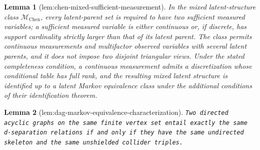 \documentclass{article}
\newtheorem{lemma}{Lemma}
\begin{document}
\begin{lemma}[lem:chen-mixed-sufficient-measurement]\label{lem:chen-mixed-sufficient-measurement}
In the mixed latent-structure class \(\mathcal M_{\mathrm{Chen}}\), every latent-parent set is required to have two sufficient measured variables; a sufficient measured variable is either continuous or, if discrete, has support cardinality strictly larger than that of its latent parent. The class permits continuous measurements and multifactor observed variables with several latent parents, and it does not impose two disjoint triangular views. Under the stated completeness condition, a continuous measurement admits a discretization whose conditional table has full rank, and the resulting mixed latent structure is identified up to a latent Markov equivalence class under the additional conditions of their identification theorem.
\end{lemma}

\begin{lemma}[lem:dag-markov-equivalence-characterization]\label{lem:dag-markov-equivalence-characterization}
\texttt{Two directed acyclic graphs on the same finite vertex set entail exactly the same d-\allowbreak{}separation relations if and only if they have the same undirected skeleton and the same unshielded collider triples.}
\end{lemma}
\end{document}
